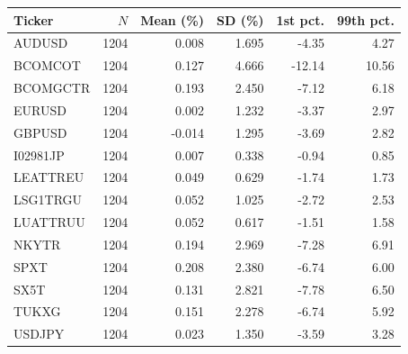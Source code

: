 \par\medskip\noindent
{\small
\begin{tabular}{@{}lrrrrr@{}}
\toprule
Ticker & $N$ & Mean (\%) & SD (\%) & 1st pct. & 99th pct.\\
\midrule
AUDUSD & 1204 & 0.008 & 1.695 & -4.35 & 4.27\\
BCOMCOT & 1204 & 0.127 & 4.666 & -12.14 & 10.56\\
BCOMGCTR & 1204 & 0.193 & 2.450 & -7.12 & 6.18\\
EURUSD & 1204 & 0.002 & 1.232 & -3.37 & 2.97\\
GBPUSD & 1204 & -0.014 & 1.295 & -3.69 & 2.82\\
I02981JP & 1204 & 0.007 & 0.338 & -0.94 & 0.85\\
LEATTREU & 1204 & 0.049 & 0.629 & -1.74 & 1.73\\
LSG1TRGU & 1204 & 0.052 & 1.025 & -2.72 & 2.53\\
LUATTRUU & 1204 & 0.052 & 0.617 & -1.51 & 1.58\\
NKYTR & 1204 & 0.194 & 2.969 & -7.28 & 6.91\\
SPXT & 1204 & 0.208 & 2.380 & -6.74 & 6.00\\
SX5T & 1204 & 0.131 & 2.821 & -7.78 & 6.50\\
TUKXG & 1204 & 0.151 & 2.278 & -6.74 & 5.92\\
USDJPY & 1204 & 0.023 & 1.350 & -3.59 & 3.28\\
\bottomrule
\end{tabular}
}
\par\medskip
